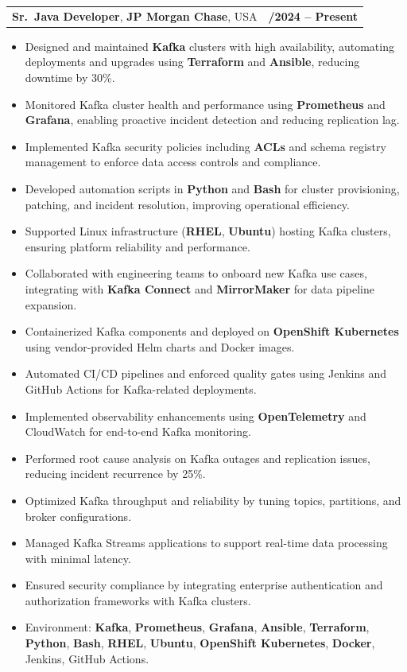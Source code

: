 \documentclass[letterpaper,11pt]{article}
\makeatletter
\newcommand{\resumeItem}[1]{
  \item\footnotesize{
    {#1 \vspace{-2pt}}
  }
}
\newcommand{\resumeSubheading}[4]{
  \vspace{-2pt}\item
    \begin{tabular*}{1.0\textwidth}[t]{l@{\extracolsep{\fill}}r}
      \textbf{\fontsize{10pt}{14pt}\selectfont #3}, \textbf{\fontsize{10pt}{14pt}\selectfont #1}, \fontsize{10pt}{14pt}\selectfont #4 & \textbf{\fontsize{10pt}{14pt}\selectfont #2} \\
    \end{tabular*}\vspace{-7pt}
}
\newcommand{\resumeItemListStart}{\begin{itemize}[leftmargin=*]}
\newcommand{\resumeItemListEnd}{\end{itemize}\vspace{-5pt}}
\makeatother
\begin{document}
\resumeSubheading
{JP Morgan Chase}{09/2024 -- Present}
{Sr.\ Java Developer}{USA}
\resumeItemListStart
  \resumeItem{Designed and maintained \textbf{Kafka} clusters with high availability, automating deployments and upgrades using \textbf{Terraform} and \textbf{Ansible}, reducing downtime by 30\%.}
  \resumeItem{Monitored Kafka cluster health and performance using \textbf{Prometheus} and \textbf{Grafana}, enabling proactive incident detection and reducing replication lag.}
  \resumeItem{Implemented Kafka security policies including \textbf{ACLs} and schema registry management to enforce data access controls and compliance.}
  \resumeItem{Developed automation scripts in \textbf{Python} and \textbf{Bash} for cluster provisioning, patching, and incident resolution, improving operational efficiency.}
  \resumeItem{Supported Linux infrastructure (\textbf{RHEL}, \textbf{Ubuntu}) hosting Kafka clusters, ensuring platform reliability and performance.}
  \resumeItem{Collaborated with engineering teams to onboard new Kafka use cases, integrating with \textbf{Kafka Connect} and \textbf{MirrorMaker} for data pipeline expansion.}
  \resumeItem{Containerized Kafka components and deployed on \textbf{OpenShift Kubernetes} using vendor-provided Helm charts and Docker images.}
  \resumeItem{Automated CI/CD pipelines and enforced quality gates using Jenkins and GitHub Actions for Kafka-related deployments.}
  \resumeItem{Implemented observability enhancements using \textbf{OpenTelemetry} and CloudWatch for end-to-end Kafka monitoring.}
  \resumeItem{Performed root cause analysis on Kafka outages and replication issues, reducing incident recurrence by 25\%.}
  \resumeItem{Optimized Kafka throughput and reliability by tuning topics, partitions, and broker configurations.}
  \resumeItem{Managed Kafka Streams applications to support real-time data processing with minimal latency.}
  \resumeItem{Ensured security compliance by integrating enterprise authentication and authorization frameworks with Kafka clusters.}
  \resumeItem{Environment: \textbf{Kafka}, \textbf{Prometheus}, \textbf{Grafana}, \textbf{Ansible}, \textbf{Terraform}, \textbf{Python}, \textbf{Bash}, \textbf{RHEL}, \textbf{Ubuntu}, \textbf{OpenShift Kubernetes}, \textbf{Docker}, Jenkins, GitHub Actions.}
\resumeItemListEnd
\end{document}
